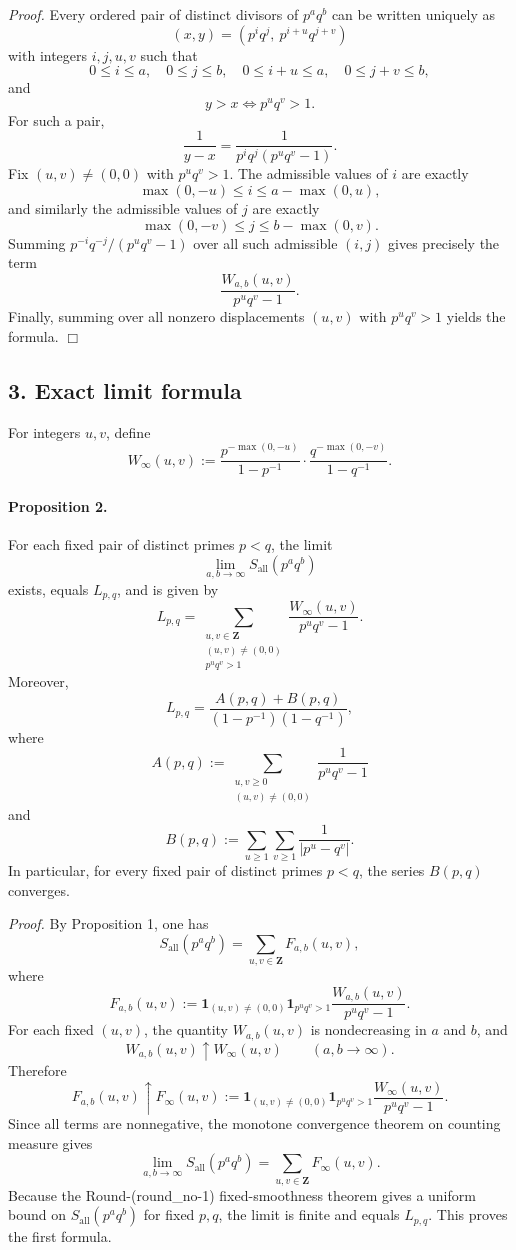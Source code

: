 \emph{Proof.}
Every ordered pair of distinct divisors of \(p^a q^b\) can be written uniquely as
\[
(x,y)=(p^i q^j,\ p^{i+u}q^{j+v})
\]
with integers \(i,j,u,v\) such that
\[
0\le i\le a,\quad 0\le j\le b,\quad 0\le i+u\le a,\quad 0\le j+v\le b,
\]
and
\[
y>x \iff p^u q^v>1.
\]
For such a pair,
\[
\frac{1}{y-x}
=
\frac{1}{p^i q^j(p^u q^v-1)}.
\]
Fix \((u,v)\neq(0,0)\) with \(p^u q^v>1\). The admissible values of \(i\) are exactly
\[
\max(0,-u)\le i\le a-\max(0,u),
\]
and similarly the admissible values of \(j\) are exactly
\[
\max(0,-v)\le j\le b-\max(0,v).
\]
Summing \(p^{-i}q^{-j}/(p^u q^v-1)\) over all such admissible \((i,j)\) gives precisely the term
\[
\frac{W_{a,b}(u,v)}{p^u q^v-1}.
\]
Finally, summing over all nonzero displacements \((u,v)\) with \(p^u q^v>1\) yields the formula.
\hfill\(\Box\)

\subsection*{3. Exact limit formula}

For integers \(u,v\), define
\[
W_{\infty}(u,v)
:=
\frac{p^{-\max(0,-u)}}{1-p^{-1}}\cdot \frac{q^{-\max(0,-v)}}{1-q^{-1}}.
\]

\paragraph{Proposition 2.}
For each fixed pair of distinct primes \(p<q\), the limit
\[
\lim_{a,b\to\infty}S_{\mathrm{all}}(p^a q^b)
\]
exists, equals \(L_{p,q}\), and is given by
\[
L_{p,q}
=
\sum_{\substack{u,v\in\mathbf Z\\(u,v)\neq(0,0)\\p^u q^v>1}}
\frac{W_{\infty}(u,v)}{p^u q^v-1}.
\]
Moreover,
\[
L_{p,q}
=
\frac{A(p,q)+B(p,q)}{(1-p^{-1})(1-q^{-1})},
\]
where
\[
A(p,q):=\sum_{\substack{u,v\ge 0\\(u,v)\neq(0,0)}}\frac{1}{p^u q^v-1}
\]
and
\[
B(p,q):=\sum_{u\ge 1}\sum_{v\ge 1}\frac{1}{|p^u-q^v|}.
\]
In particular, for every fixed pair of distinct primes \(p<q\), the series \(B(p,q)\) converges.

\emph{Proof.}
By Proposition 1, one has
\[
S_{\mathrm{all}}(p^a q^b)
=
\sum_{u,v\in\mathbf Z}F_{a,b}(u,v),
\]
where
\[
F_{a,b}(u,v)
:=
\mathbf 1_{(u,v)\neq(0,0)}\mathbf 1_{p^u q^v>1}
\frac{W_{a,b}(u,v)}{p^u q^v-1}.
\]
For each fixed \((u,v)\), the quantity \(W_{a,b}(u,v)\) is nondecreasing in \(a\) and \(b\), and
\[
W_{a,b}(u,v)\uparrow W_{\infty}(u,v)
\qquad (a,b\to\infty).
\]
Therefore
\[
F_{a,b}(u,v)\uparrow F_{\infty}(u,v)
:=
\mathbf 1_{(u,v)\neq(0,0)}\mathbf 1_{p^u q^v>1}
\frac{W_{\infty}(u,v)}{p^u q^v-1}.
\]
Since all terms are nonnegative, the monotone convergence theorem on counting measure gives
\[
\lim_{a,b\to\infty}S_{\mathrm{all}}(p^a q^b)
=
\sum_{u,v\in\mathbf Z}F_{\infty}(u,v).
\]
Because the Round-(round\_no-1) fixed-smoothness theorem gives a uniform bound on
\(S_{\mathrm{all}}(p^a q^b)\) for fixed \(p,q\), the limit is finite and equals \(L_{p,q}\).
This proves the first formula.

